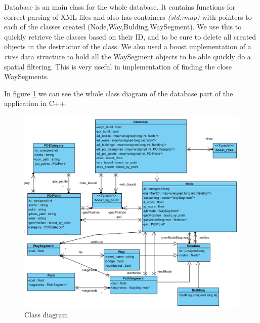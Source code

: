 Database is an main class for the whole database. It contains functions for correct parsing of XML files and also has containers \textit{(std::map)} with pointers to each of the classes created (Node,Way,Bulding,WaySegment). We use this to quickly retrieve the classes based on their ID, and to be sure to delete all created objects in the destructor of the class. We also used a boost implementation of a \textit{rtree} data structure to hold all the WaySegment objects to be able quickly do a spatial filtering. This is very useful in implementation of finding the close WaySegments.
\par
In figure \ref{fig:db_class} we can see the whole class diagram of the database part of the application in C++.
 \begin{figure}[h]
 \centering
 \includegraphics[width=0.9\linewidth]{../pictures/Class_Diagram.png}
 \caption{Class diagram}
 \label{fig:db_class}
 \end{figure}

